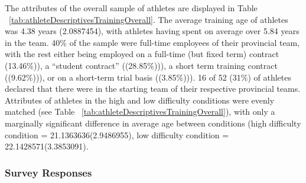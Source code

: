 \documentclass[english]{article}\usepackage[]{graphicx}\usepackage[]{color}
\makeatletter
\newenvironment{kframe}{%
 \def\at@end@of@kframe{}%
 \ifinner\ifhmode%
  \def\at@end@of@kframe{\end{minipage}}%
  \begin{minipage}{\columnwidth}%
 \fi\fi%
 \def\FrameCommand##1{\hskip\@totalleftmargin \hskip-\fboxsep
 \colorbox{shadecolor}{##1}\hskip-\fboxsep
     \hskip-\linewidth \hskip-\@totalleftmargin \hskip\columnwidth}%
 \MakeFramed {\advance\hsize-\width
   \@totalleftmargin\z@ \linewidth\hsize
   \@setminipage}}%
 {\par\unskip\endMakeFramed%
 \at@end@of@kframe}
\newenvironment{knitrout}{}{} %
\makeatother
\begin{document}
\begin{knitrout}
\color{fgcolor}\begin{kframe}


{\ttfamily\noindent\color{warningcolor}{\#\# Warning in bind\_rows\_(x, .id): Unequal factor levels: coercing to character}}

{\ttfamily\noindent\color{warningcolor}{\#\# Warning in bind\_rows\_(x, .id): binding character and factor vector, coercing into character vector}}

{\ttfamily\noindent\color{warningcolor}{\#\# Warning in bind\_rows\_(x, .id): binding character and factor vector, coercing into character vector}}

{\ttfamily\noindent\bfseries\color{errorcolor}{\#\# Error in library(table): there is no package called 'table'}}\end{kframe}
\end{knitrout}









The attributes of the overall sample of athletes are displayed in Table ~\ref{tab:athleteDescriptivesTrainingOverall}. The average training age of athletes was 4.38 years (2.0887454), with athletes having spent on average over 5.84 years in the team.
40\% of the sample were full-time employees of their provincial team, with the rest either being employed on a full-time (but fixed term) contract
(13.46\%)), a ``student contract'' ((28.85\%))), a short term training contract
((9.62\%))), or on a short-term trial basis ((3.85\%))).
 16 of 52 (31\%) of athletes declared that there were in the starting team of their respective provincial teams.
Attributes of athletes in the high and low difficulty conditions were evenly matched (see Table ~\ref{tab:athleteDescriptivesTrainingOverall}), with only a marginally significant difference in average age between conditions (high difficulty condition = 21.1363636(2.9486955), low difficulty condition = 22.1428571(3.3853091).

\subsubsection{Survey Responses}
\end{document}
